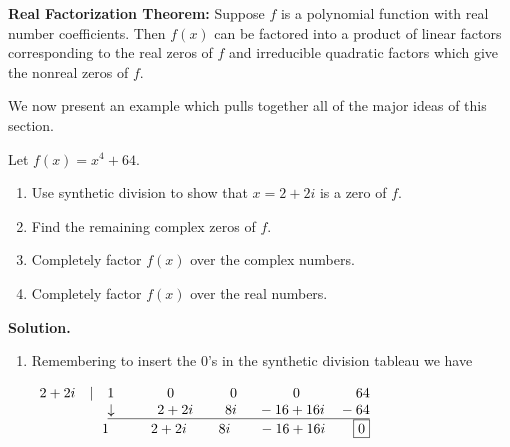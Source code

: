\documentclass{ximera}
\begin{document}
 

\begin{theorem}\label{realfactorization}\textbf{Real Factorization Theorem:} Suppose $f$ is a polynomial function with real number coefficients.  Then $f(x)$ can be factored into a product of linear factors corresponding to the real zeros of $f$ and irreducible quadratic factors which give the nonreal zeros of $f$. 
\end{theorem}

 

We now present an example which pulls together all of the major ideas of this section.

\begin{example}  Let $f(x) = x^4+64$.  

\begin{enumerate}

\item  Use synthetic division to show that $x=2+2i$ is a zero of $f$.

\item  Find the remaining complex zeros of $f$.

\item  Completely factor $f(x)$ over the complex numbers.

\item  Completely factor $f(x)$ over the real numbers.

\end{enumerate}

{ \bf Solution.}

\begin{enumerate}

\item  Remembering to insert the $0$'s in the synthetic division tableau we have

\begin{center}
$
\begin{array}{r}
 2+2i \quad |\quad 1 \phantom{1.}\quad\quad\quad 0 \quad\quad\quad\quad 0 \quad\quad\quad\quad 0 \quad\quad\quad\quad 64\\
 \underline{\downarrow \phantom{1.}\quad\quad  2+2i \quad\phantom{11.} 8i\quad\phantom{1} -16+16i \quad -64}\\
 \quad 1 \phantom{11}\quad\quad 2+2i \quad\phantom{11.} 8i \quad\quad -16+16i \quad \phantom{11}\fbox{0}\\
\end{array}
$    
\end{center}




\end{enumerate}
\end{example}
\end{document}
